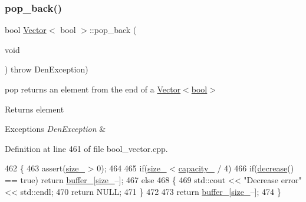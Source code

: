 \subsubsection{\texorpdfstring{pop\+\_\+back()}{pop\_back()}}
{\footnotesize\ttfamily bool \hyperlink{classVector}{Vector}$<$ bool $>$\+::pop\+\_\+back (\begin{DoxyParamCaption}\item[{void}]{ }\end{DoxyParamCaption}) throw  Den\+Exception) }



pop  returns an element from the end of a \hyperlink{classVector_3_01bool_01_4}{Vector$<$bool$>$} 

\begin{DoxyReturn}{Returns}
element 
\end{DoxyReturn}

\begin{DoxyExceptions}{Exceptions}
{\em Den\+Exception} & \\
\hline
\end{DoxyExceptions}


Definition at line 461 of file bool\+\_\+vector.\+cpp.


\begin{DoxyCode}
462     \{
463         assert(\hyperlink{classVector_3_01bool_01_4_a07895adb41b2c819f85640e35c0d4ae0}{size\_} > 0);
464 
465         \textcolor{keywordflow}{if}(\hyperlink{classVector_3_01bool_01_4_a07895adb41b2c819f85640e35c0d4ae0}{size\_} < \hyperlink{classVector_3_01bool_01_4_ac3da0e4580bca55cab445ed3f9c50f2d}{capacity\_} / 4)
466             \textcolor{keywordflow}{if}(\hyperlink{classVector_3_01bool_01_4_a39afbd4a74eac5e2eb4363eed1f98adf}{decrease}() == \textcolor{keyword}{true})  \textcolor{keywordflow}{return} \hyperlink{classVector_3_01bool_01_4_ae2183c11de877eb13209c6a5a593604f}{buffer\_}[\hyperlink{classVector_3_01bool_01_4_a07895adb41b2c819f85640e35c0d4ae0}{size\_}--];
467             \textcolor{keywordflow}{else}
468                 \{
469                     std::cout << \textcolor{stringliteral}{"Decrease error"} << std::endl;
470                     \textcolor{keywordflow}{return} NULL;
471                 \}
472 
473         \textcolor{keywordflow}{return} \hyperlink{classVector_3_01bool_01_4_ae2183c11de877eb13209c6a5a593604f}{buffer\_}[\hyperlink{classVector_3_01bool_01_4_a07895adb41b2c819f85640e35c0d4ae0}{size\_}--];
474     \}
\end{DoxyCode}
\mbox{\label{classVector_3_01bool_01_4_a8ea33e431ec6cd90840a392f84aefdae}} 
